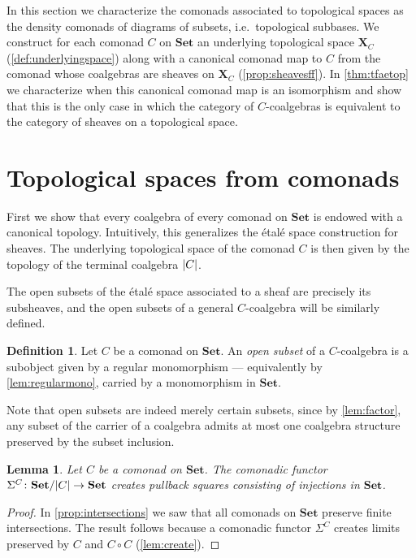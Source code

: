 \documentclass[11pt, oneside, article]{memoir}
\theoremstyle{plain}
\newtheorem{lemma}[theorem]{Lemma}
\theoremstyle{definition}
\newtheorem{definition}[def]{Definition}
\theoremstyle{remark}
\DeclarePairedDelimiter{\abs}{\lvert}{\rvert}
\newcommand{\namedcat}[1]{\mathbf{#1}}
\newcommand{\spa}[1]{\mathbf{#1}}
\newcommand{\Set}{\namedcat{Set}}
\newcommand{\pts}[1]{{\abs{#1}}}
\newcommand{\carr}{\Sigma}
\newcommand{\car}[1]{\carr^{#1}}
\newcommand{\carC}{\car{\cC}}
\newcommand{\cmnd}[1]{{#1}}
\newcommand{\cC}{\cmnd{C}}
\newcommand{\tX}{\spa{X}}
\newcommand{\SetC}{\Set/\pts{\cC}}
\newcommand{\cmdtotop}[1]{{\tX_{#1}}}
\begin{document}
In this section we characterize the comonads associated to topological spaces as the density
comonads of diagrams of subsets, i.e.\ topological
subbases. We construct for each comonad $\cC$ on $\Set$ an underlying
topological space $\cmdtotop{\cC}$ (\cref{def:underlyingspace}) along
with a canonical comonad map to $\cC$ from the comonad whose
coalgebras are sheaves on $\cmdtotop{\cC}$ (\cref{prop:sheavesff}). In
\cref{thm:tfaetop} we characterize when this canonical comonad map is
an isomorphism and show that this is the only case in which the
category of $\cC$-coalgebras is equivalent to the category of sheaves
on a topological space.

\section{Topological spaces from comonads}\label{sec:toptocomonad}

First we show that every coalgebra of every comonad on $\Set$ is
endowed with a canonical topology. Intuitively, this generalizes the
\'etal\'e space construction for sheaves. The underlying topological
space of the comonad $\cC$ is then given by the topology of the
terminal coalgebra $\pts{\cC}$.

The open subsets of the \'etal\'e space associated to a sheaf are precisely its
subsheaves, and the open subsets of a general $\cC$-coalgebra will be
similarly defined.

\begin{definition}\label{def:open}
  Let $\cC$ be a comonad on $\Set$. An \emph{open subset} of a $\cC$-coalgebra is a
  subobject given by a regular monomorphism --- equivalently by
  \cref{lem:regularmono}, carried by a monomorphism in $\Set$.
\end{definition}

Note that open subsets are indeed merely certain subsets, since by
\cref{lem:factor}, any subset of the carrier of a coalgebra admits at
most one coalgebra structure preserved by the subset inclusion.

\begin{lemma}
  Let $\cC$ be a comonad on $\Set$. The comonadic functor
  $\carC \colon \SetC \to \Set$ creates pullback squares consisting of
  injections in $\Set$.
\end{lemma}
\begin{proof}
  In \cref{prop:intersections} we saw that all comonads on $\Set$
  preserve finite intersections. The result follows because a
  comonadic functor $\carC$ creates limits preserved by $\cC$ and
  $\cC \circ \cC$ (\cref{lem:create}).
\end{proof}
\end{document}
